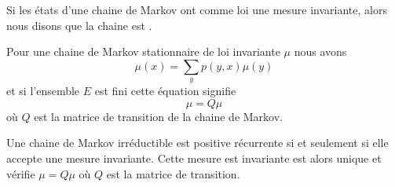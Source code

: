 \begin{definition}
	Si les états d'une chaine de Markov ont comme loi une mesure invariante, alors nous disons que la chaine est .
\end{definition}

\begin{remark}\label{RemcOEylF}
	Pour une chaine de Markov stationnaire de loi invariante \( \mu\) nous avons
	\begin{equation}
		\mu(x)=\sum_yp(y,x)\mu(y)
	\end{equation}
	et si l'ensemble \( E\) est fini cette équation signifie
	\begin{equation}
		\mu=Q\mu
	\end{equation}
	où \( Q\) est la matrice de transition de la chaine de Markov.
\end{remark}


\begin{theorem}
	Une chaine de Markov irréductible est positive récurrente si et seulement si elle accepte une mesure invariante. Cette mesure est invariante est alors unique et vérifie \( \mu=Q\mu\) où \( Q\) est la matrice de transition.
\end{theorem}

